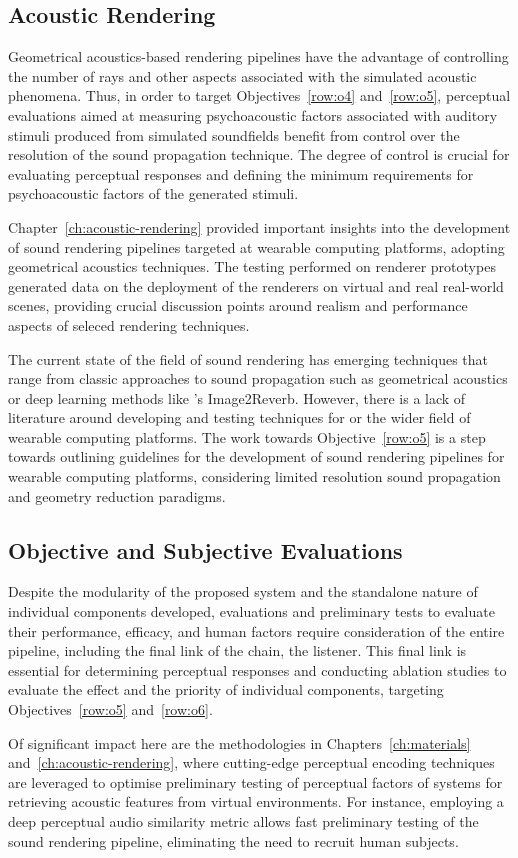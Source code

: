 \subsection{Acoustic Rendering}
Geometrical acoustics-based rendering pipelines have the advantage of controlling the number of rays and other aspects associated with the simulated acoustic phenomena. Thus, in order to target Objectives~\ref{row:o4} and~\ref{row:o5}, perceptual evaluations aimed at measuring psychoacoustic factors associated with auditory stimuli produced from simulated soundfields benefit from control over the resolution of the sound propagation technique. The degree of control is crucial for evaluating perceptual responses and defining the minimum requirements for psychoacoustic factors of the generated stimuli.\par
Chapter~\ref{ch:acoustic-rendering} provided important insights into the development of sound rendering pipelines targeted at wearable computing platforms, adopting geometrical acoustics techniques. The testing performed on renderer prototypes generated data on the deployment of the renderers on virtual and real real-world scenes, providing crucial discussion points around realism and performance aspects of seleced rendering techniques.\par
The current state of the field of sound rendering has emerging techniques that range from classic approaches to sound propagation such as geometrical acoustics \citep{savioja2015overview} or deep learning methods like \cite{Singh_2021_ICCV}'s Image2Reverb. However, there is a lack of literature around developing and testing techniques for  or the wider field of wearable computing platforms. The work towards Objective~\ref{row:o5} is a step towards outlining guidelines for the development of sound rendering pipelines for wearable computing platforms, considering limited resolution sound propagation and geometry reduction paradigms.

\subsection{Objective and Subjective Evaluations}
Despite the modularity of the proposed system and the standalone nature of individual components developed, evaluations and preliminary tests to evaluate their performance, efficacy, and human factors require consideration of the entire pipeline, including the final link of the chain, the listener. This final link is essential for determining perceptual responses and conducting ablation studies to evaluate the effect and the priority of individual components, targeting Objectives~\ref{row:o5} and~\ref{row:o6}.\par
Of significant impact here are the methodologies in Chapters~\ref{ch:materials} and~\ref{ch:acoustic-rendering}, where cutting-edge perceptual encoding techniques are leveraged to optimise preliminary testing of perceptual factors of systems for retrieving acoustic features from virtual environments. For instance, employing a deep perceptual audio similarity metric allows fast preliminary testing of the sound rendering pipeline, eliminating the need to recruit human subjects.

